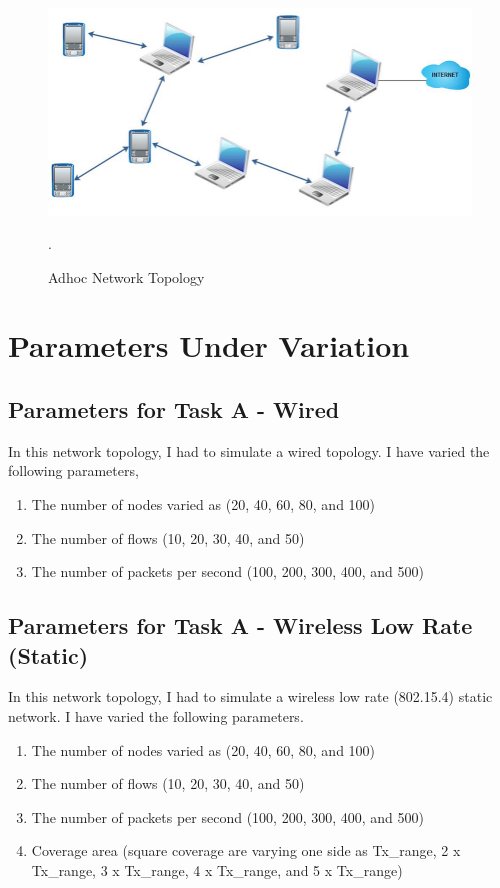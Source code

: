 \documentclass[12pt, a4paper]{article}
\begin{document}
\begin{figure}[H]
\centering
\includegraphics[scale = 0.6]{images/MANET.png}
\caption{Adhoc Network Topology}.
\label{fig:task_a_wired}
\end{figure}


\section{Parameters Under Variation}
\subsection{Parameters for Task A - Wired}

In this network topology, I had to simulate a wired topology.
I have varied the following parameters,
\begin{enumerate}
    \item The number of nodes varied as (20, 40, 60, 80, and 100)
    \item The number of flows (10, 20, 30, 40, and 50) 
    \item The number of packets per second (100, 200, 300, 400, and 500) 
\end{enumerate}
\subsection{Parameters for Task A - Wireless Low Rate (Static)}
In this network topology, I had to simulate a wireless low rate (802.15.4) static network. I have varied the following parameters.
\begin{enumerate}
    \item The number of nodes varied as (20, 40, 60, 80, and 100)
    \item The number of flows (10, 20, 30, 40, and 50) 
    \item The number of packets per second (100, 200, 300, 400, and 500)
    \item Coverage area (square coverage are varying one side as Tx\_range, 2 x Tx\_range, 3 x Tx\_range, 4 x Tx\_range, and 5 x Tx\_range)
\end{enumerate}
\end{document}
